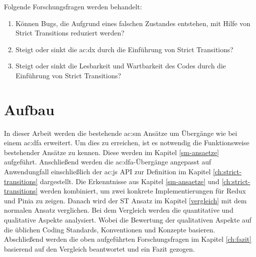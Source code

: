 Folgende Forschungsfragen werden behandelt:

\begin{enumerate}
  \item Können Bugs, die Aufgrund eines falschen Zustandes entstehen, mit Hilfe von Strict Transitions reduziert werden?
  \item Steigt oder sinkt die \acrshort{ac:dx} durch die Einführung von Strict Transitions?
  \item Steigt oder sinkt die Lesbarkeit und Wartbarkeit des Codes durch die Einführung von Strict Transitions?
\end{enumerate}

\section{Aufbau}

In dieser Arbeit werden die bestehende \acrshort{ac:sm} Ansätze um Übergänge wie bei einem \acrshort{ac:dfa} erweitert. Um dies zu erreichen, ist es notwendig die Funktionsweise bestehender Ansätze zu kennen. Diese werden im Kapitel \ref{sm-ansaetze} aufgeführt. Anschließend werden die \acrlong{ac:dfa}-Übergänge angepasst auf Anwendungfall einschließlich der \acrlong{ac:js} API zur Definition im Kapitel \ref{ch:strict-transitions} dargestellt. Die Erkenntnisse aus Kapitel \ref{sm-ansaetze} und \ref{ch:strict-transitions} werden kombiniert, um zwei konkrete Implementierungen für Redux und Pinia zu zeigen. Danach wird der ST Ansatz im Kapitel \ref{vergleich} mit dem normalen Ansatz verglichen. Bei dem Vergleich werden die quantitative und qualitative Aspekte analysiert. Wobei die Bewertung der qualitativen Aspekte auf die üblichen Coding Standards, Konventionen und Konzepte basieren. Abschließend werden die oben aufgeführten Forschungsfragen im Kapitel \ref{ch:fazit} basierend auf den Vergleich beantwortet und ein Fazit gezogen.

